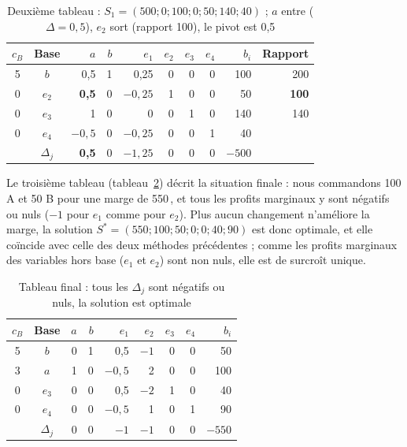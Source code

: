 \documentclass[11pt,a4paper]{article}
\newcommand{\eur}{\,\text{€}}
\begin{document}
\begin{table}[!htbp]
\centering\footnotesize
\caption{Deuxième tableau : $S_1 = (500 ; 0 ; 100 ; 0 ; 50 ; 140 ; 40)$ ; $a$ entre ($\Delta = 0{,}5$), $e_2$ sort (rapport 100), le pivot est 0,5}\label{tab:s2}
\begin{tabular}{@{}cc|rrrrrr|r|r@{}}
\toprule
$c_B$ & Base & $a$ & $b$ & $e_1$ & $e_2$ & $e_3$ & $e_4$ & $b_i$ & Rapport \\
\midrule
5 & $b$ & 0,5 & 1 & 0,25 & 0 & 0 & 0 & 100 & 200 \\
0 & $e_2$ & \textbf{0,5} & 0 & $-0{,}25$ & 1 & 0 & 0 & 50 & \textbf{100} \\
0 & $e_3$ & 1 & 0 & 0 & 0 & 1 & 0 & 140 & 140 \\
0 & $e_4$ & $-0{,}5$ & 0 & $-0{,}25$ & 0 & 0 & 1 & 40 & \\
\midrule
 & $\Delta_j$ & \textbf{0,5} & 0 & $-1{,}25$ & 0 & 0 & 0 & $-500$ & \\
\bottomrule
\end{tabular}
\end{table}

Le troisième tableau (tableau~\ref{tab:s3}) décrit la situation finale : nous commandons 100 A
et 50 B pour une marge de 550\eur, et tous les profits marginaux y sont négatifs ou nuls
($-1$ pour $e_1$ comme pour $e_2$). Plus aucun changement n'améliore la marge, la solution
$S^{*} = (550 ; 100 ; 50 ; 0 ; 0 ; 40 ; 90)$ est donc optimale, et elle coïncide avec celle des
deux méthodes précédentes ; comme les profits marginaux des variables hors base ($e_1$ et
$e_2$) sont non nuls, elle est de surcroît unique.

\begin{table}[!htbp]
\centering\footnotesize
\caption{Tableau final : tous les $\Delta_j$ sont négatifs ou nuls, la solution est optimale}\label{tab:s3}
\begin{tabular}{@{}cc|rrrrrr|r@{}}
\toprule
$c_B$ & Base & $a$ & $b$ & $e_1$ & $e_2$ & $e_3$ & $e_4$ & $b_i$ \\
\midrule
5 & $b$ & 0 & 1 & 0,5 & $-1$ & 0 & 0 & 50 \\
3 & $a$ & 1 & 0 & $-0{,}5$ & 2 & 0 & 0 & 100 \\
0 & $e_3$ & 0 & 0 & 0,5 & $-2$ & 1 & 0 & 40 \\
0 & $e_4$ & 0 & 0 & $-0{,}5$ & 1 & 0 & 1 & 90 \\
\midrule
 & $\Delta_j$ & 0 & 0 & $-1$ & $-1$ & 0 & 0 & $-550$ \\
\bottomrule
\end{tabular}
\end{table}
\end{document}
